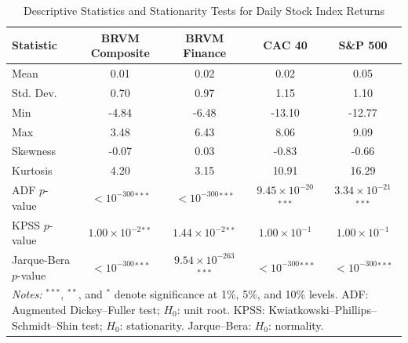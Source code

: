 \begin{table}[htbp]
\centering
\caption{Descriptive Statistics and Stationarity Tests for Daily Stock Index Returns}
\label{tab:desc_stats}
\begin{tabular}{lcccc}
\hline\hline
Statistic & BRVM Composite & BRVM Finance & CAC 40 & S\&P 500 \\
\hline
Mean & 0.01 & 0.02 & 0.02 & 0.05 \\
Std. Dev. & 0.70 & 0.97 & 1.15 & 1.10 \\
Min & -4.84 & -6.48 & -13.10 & -12.77 \\
Max & 3.48 & 6.43 & 8.06 & 9.09 \\
Skewness & -0.07 & 0.03 & -0.83 & -0.66 \\
Kurtosis & 4.20 & 3.15 & 10.91 & 16.29 \\
\hline
ADF $p$-value & $< 10^{-300}$$^{***}$ & $< 10^{-300}$$^{***}$ & $9.45 \times 10^{-20}$$^{***}$ & $3.34 \times 10^{-21}$$^{***}$ \\
KPSS $p$-value & $1.00 \times 10^{-2}$$^{**}$ & $1.44 \times 10^{-2}$$^{**}$ & $1.00 \times 10^{-1}$ & $1.00 \times 10^{-1}$ \\
Jarque-Bera $p$-value & $< 10^{-300}$$^{***}$ & $9.54 \times 10^{-263}$$^{***}$ & $< 10^{-300}$$^{***}$ & $< 10^{-300}$$^{***}$ \\
\hline\hline
\multicolumn{5}{l}{\footnotesize \textit{Notes:} $^{***}$, $^{**}$, and $^{*}$ denote significance at 1\%, 5\%, and 10\% levels. ADF: Augmented Dickey--Fuller test; $H_0$: unit root. KPSS: Kwiatkowski--Phillips--Schmidt--Shin test; $H_0$: stationarity. Jarque--Bera: $H_0$: normality.} \\
\end{tabular}
\end{table}
